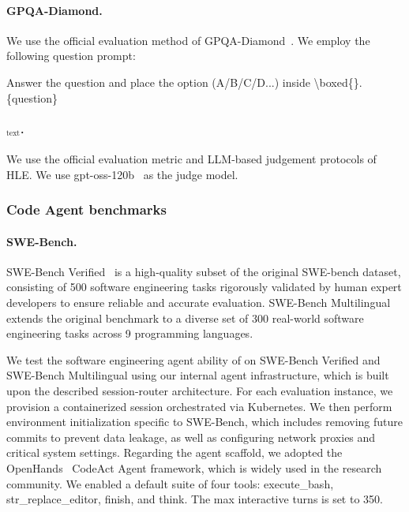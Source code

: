 \paragraph{GPQA-Diamond.} We use the official evaluation method of GPQA-Diamond~\cite{rein2023gpqa}. We employ the following question prompt:

\begin{MyBox}{}

Answer the question and place the option (A/B/C/D...) inside \textbackslash boxed\{\}.\newline
\newline
\{question\}
\end{MyBox}

\paragraph{$_\text{text}$.} We use the official evaluation metric and LLM-based judgement protocols of HLE. We use gpt-oss-120b~\cite{openai2025gptoss120bgptoss20bmodel} as the judge model.

\subsubsection{Code Agent benchmarks}\label{sec:code-agent}

\paragraph{SWE-Bench.}
SWE-Bench Verified~\cite{swe_verified} is a high-quality subset of the original SWE-bench dataset, consisting of 500 software engineering tasks rigorously validated by human expert developers to ensure reliable and accurate evaluation. SWE-Bench Multilingual extends the original benchmark to a diverse set of 300 real-world software engineering tasks across 9 programming languages.

We test the software engineering agent ability of \ourmodel on SWE-Bench Verified and SWE-Bench Multilingual using our internal agent infrastructure, which is built upon the described session-router architecture. For each evaluation instance, we provision a containerized session orchestrated via Kubernetes. We then perform environment initialization specific to SWE-Bench, which includes removing future commits to prevent data leakage, as well as configuring network proxies and critical system settings.
Regarding the agent scaffold, we adopted the OpenHands~\cite{wang2024openhands} CodeAct Agent framework, which is widely used in the research community. We enabled a default suite of four tools: execute\_bash, str\_replace\_editor, finish, and think. The max interactive turns is set to 350.

